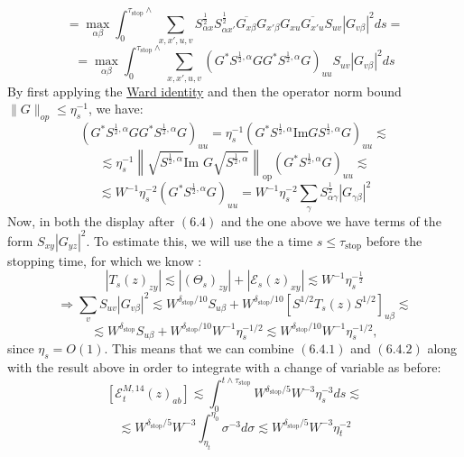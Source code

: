 \documentclass[11pt]{article}
\newcommand{\E}{\mathcal{E}}
\newcommand{\sto}{\text{stop}}
\newcommand{\im}{\text{Im }}
\begin{document}
\begin{equation*}=\max_{\alpha\beta}\int_0^{\tau_\sto\wedge}\sum_{x, x', u, v}S^{\frac{1}{2}}_{\alpha x}S^{\frac{1}{2}}_{\alpha x'}\overline{G_{x\beta}}G_{x'\beta}G_{xu}\overline{G_{x'u}}S_{uv}|G_{v\beta}|^2ds=\tag{6.4}\end{equation*}
\begin{equation*}=\max_{\alpha\beta}\int_0^{\tau_\sto\wedge}\sum_{x, x', u, v}\left(G^*S^{\frac{1}{2}, \alpha}GG^*S^{\frac{1}{2},\alpha}G\right)_{uu}S_{uv}|G_{v\beta}|^2ds\tag{6.4.1}\end{equation*}
By first applying the \hyperref[ward]{Ward identity} and then the operator norm bound $\|G\|_{op}\leq \eta_s^{-1}$, we have: 
$$\left(G^*S^{\frac{1}{2}, \alpha}GG^*S^{\frac{1}{2},\alpha}G\right)_{uu} = \eta_s^{-1}\left(G^*S^{\frac{1}{2}, \alpha}\text{Im}GS^{\frac{1}{2},\alpha}G\right)_{uu}\lesssim$$
$$\lesssim \eta_s^{-1}\left\|\sqrt{S^{\frac{1}{2}, \alpha}}\im G\sqrt{S^{\frac{1}{2}, \alpha}}\right\|_{\mathrm{op}}(G^*S^{\frac{1}{2}, \alpha}G)_{uu}\lesssim$$
\begin{equation*}\lesssim W^{-1}\eta_s^{-2}(G^*S^{\frac{1}{2}, \alpha}G)_{uu} = W^{-1}\eta_s^{-2}\sum_\gamma S^{\frac{1}{2}}_{\alpha\gamma}|G_{\gamma\beta}|^2\tag{6.4.2}\end{equation*}
Now, in both the display after $(6.4)$ and the one above we have terms of the form $S_{xy}|G_{yz}|^2$. To estimate this, we will use the a time $s\leq \tau_\sto$ before the stopping time, for which we know \cite{bandSDE}: $$|T_s(z)_{zy}|\lesssim |(\Theta_s)_{zy}|+|\E_s(z)_{xy}|\lesssim W^{-1}\eta_s^{-\frac{1}{2}}$$
$$\Rightarrow \sum_v S_{uv}|G_{v\beta}|^2\lesssim W^{\delta_\sto/10}S_{u\beta}+W^{\delta_\sto/10}\left[S^{1/2}T_s(z)S^{1/2}\right]_{u\beta}\lesssim$$ 
$$\lesssim W^{\delta_\sto}S_{u\beta} + W^{\delta_\sto/10}W^{-1}\eta_s^{-1/2}\lesssim W^{\delta_\sto/10}W^{-1}\eta_s^{-1/2},$$
since $\eta_s = O(1)$. This means that we can combine $(6.4.1)$ and $(6.4.2)$ along with the result above in order to integrate with a change of variable as before: \newpage
$$\left[\E_t^{M, 14}(z)_{ab}\right]\lesssim \int_0^{t\wedge \tau_\sto} W^{\delta_\sto/5}W^{-3}\eta_s^{-3}ds\lesssim$$
$$\lesssim W^{\delta_\sto/5}W^{-3}\int_{\eta_t}^{\eta_0}\sigma^{-3}d\sigma\lesssim W^{\delta_\sto/5}W^{-3}\eta_t^{-2}$$
\end{document}
